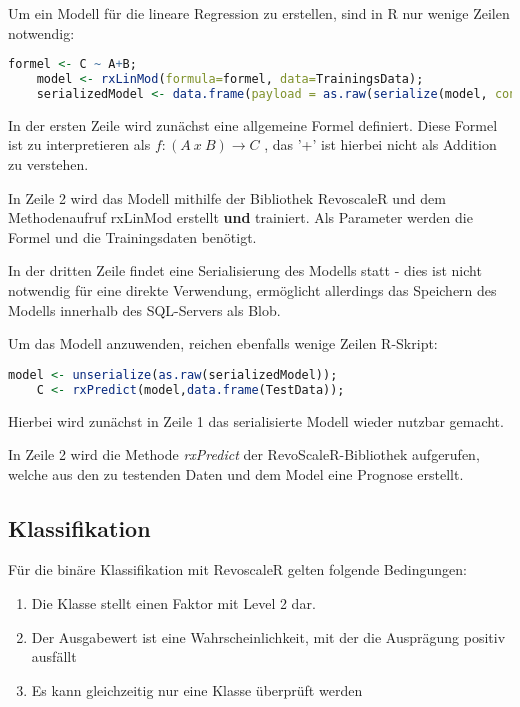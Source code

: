 Um ein Modell für die lineare Regression zu erstellen, sind in R nur wenige Zeilen notwendig: ~\newline
\begin{lstlisting}[language=R]
	formel <- C ~ A+B;
	model <- rxLinMod(formula=formel, data=TrainingsData);
	serializedModel <- data.frame(payload = as.raw(serialize(model, connection=null)));
\end{lstlisting}

In der ersten Zeile wird zunächst eine allgemeine Formel definiert. Diese Formel ist zu interpretieren als $f: (A~x~B)\rightarrow C $ , das '+' ist hierbei nicht als Addition zu verstehen.

In Zeile 2 wird das Modell mithilfe der Bibliothek RevoscaleR und dem Methodenaufruf rxLinMod erstellt \textbf{und} trainiert. Als Parameter werden die Formel und die Trainingsdaten benötigt. 

In der dritten Zeile findet eine Serialisierung des Modells statt - dies ist nicht notwendig für eine direkte Verwendung, ermöglicht allerdings das Speichern des Modells innerhalb des SQL-Servers als Blob.  

Um das Modell anzuwenden, reichen ebenfalls wenige Zeilen R-Skript: \newline

\begin{lstlisting}[language=R]
	model <- unserialize(as.raw(serializedModel)); 
	C <- rxPredict(model,data.frame(TestData));
\end{lstlisting}

Hierbei wird zunächst in Zeile 1 das serialisierte Modell wieder nutzbar gemacht. 

In Zeile 2 wird die Methode \textit{rxPredict} der RevoScaleR-Bibliothek aufgerufen, welche aus den zu testenden Daten und dem Model eine Prognose erstellt. 
\subsection{Klassifikation}
Für die binäre Klassifikation mit RevoscaleR gelten folgende Bedingungen: ~\newline

\begin{enumerate}
	\item Die Klasse stellt einen Faktor mit Level 2 dar.
	\item Der Ausgabewert ist eine Wahrscheinlichkeit, mit der die Ausprägung positiv ausfällt
	\item Es kann gleichzeitig nur eine Klasse überprüft werden
\end{enumerate}

